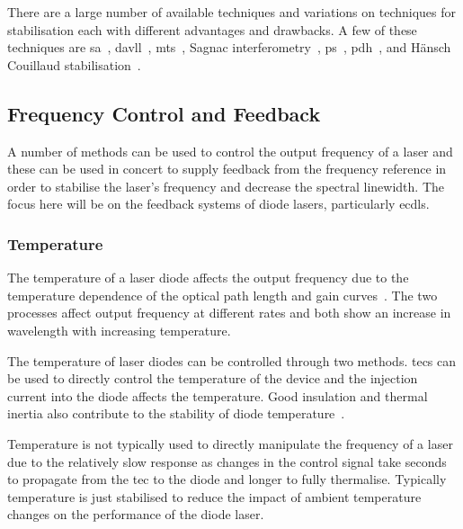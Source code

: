 There are a large number of available techniques and variations on techniques for stabilisation each with different advantages and drawbacks.
A few of these techniques are \gls{sa}~\cite{haroche_theory_1972, maguire_theoretical_2006, cuneo_optically_1994, preston_doppler-free_1996, saliba_linewidths_2009}, \gls{davll}~\cite{corwin_frequency-stabilized_1998, millett-sikking_davll_2007}, \gls{mts}~\cite{shirley_modulation_1982, mccarron_modulation_2008, xiang-hui_ultra-stable_2009,negnevitsky_wideband_2013}, Sagnac interferometry~\cite{robins_Interferometric_2002, jundt_non-linear_2003}, \acrfull{ps}~\cite{wieman_doppler-free_1976, lancaster_polarisation_1999, yoshikawa_frequency_2003, harris_polarization_2006, pearman_polarization_2002, tiwari_laser_2006, do_polarization_2008, torii_laser-phase_2012}, \gls{pdh}~\cite{drever_laser_1983}, and H\"ansch Couillaud stabilisation~\cite{hansch_laser_1980}.

\subsection{Frequency Control and Feedback}

A number of methods can be used to control the output frequency of a laser and these can be used in concert to supply feedback from the frequency reference in order to stabilise the laser's frequency and decrease the spectral linewidth.
The focus here will be on the feedback systems of diode lasers, particularly \glspl{ecdl}.

\subsubsection{Temperature}
The temperature of a laser diode affects the output frequency due to the temperature dependence of the optical path length and gain curves~\cite{wieman_using_1991}.
The two processes affect output frequency at different rates and both show an increase in wavelength with increasing temperature.

The temperature of laser diodes can be controlled through two methods. \Glspl{tec} can be used to directly control the temperature of the device and the injection current into the diode affects the temperature. Good insulation and thermal inertia also contribute to the stability of diode temperature~\cite{saliba_cold_2011}.

Temperature is not typically used to directly manipulate the frequency of a laser due to the relatively slow response as changes in the control signal take seconds to propagate from the \gls{tec} to the diode and longer to fully thermalise.
Typically temperature is just stabilised to reduce the impact of ambient temperature changes on the performance of the diode laser.

